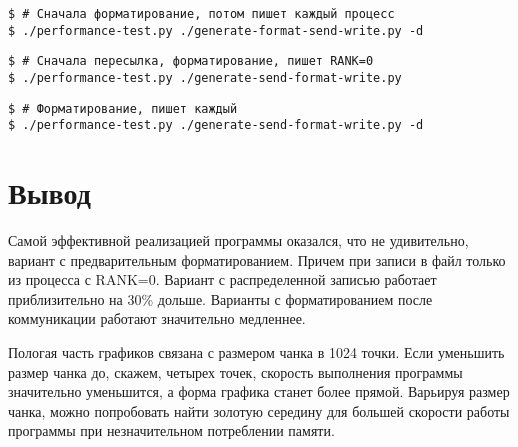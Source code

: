 \documentclass[12pt,a4paper]{article}
\begin{document}
\newpage

\begin{Verbatim}
$ # Сначала форматирование, потом пишет каждый процесс
$ ./performance-test.py ./generate-format-send-write.py -d
\end{Verbatim}

\newpage

\begin{Verbatim}
$ # Сначала пересылка, форматирование, пишет RANK=0
$ ./performance-test.py ./generate-send-format-write.py
\end{Verbatim}

\newpage

\begin{Verbatim}
$ # Форматирование, пишет каждый
$ ./performance-test.py ./generate-send-format-write.py -d
\end{Verbatim}


\section{Вывод}

Самой эффективной реализацией программы оказался, что не удивительно,
вариант с предварительным форматированием. Причем при записи в файл только
из процесса с RANK=0. Вариант с распределенной записью работает приблизительно
на 30\% дольше. Варианты с форматированием после коммуникации работают
значительно медленнее.

Пологая часть графиков связана с размером чанка в 1024 точки. Если уменьшить размер
чанка до, скажем, четырех точек, скорость выполнения программы значительно уменьшится,
а форма графика станет более прямой. Варьируя размер чанка, можно попробовать
найти золотую середину для большей скорости работы программы при незначительном
потреблении памяти.
\end{document}
